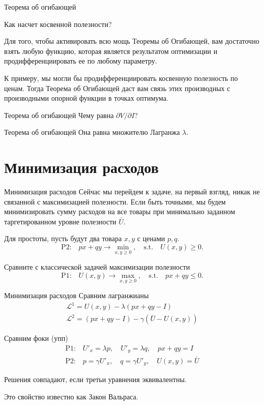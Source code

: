 \documentclass{beamer}
\begin{document}
\begin{frame}{Теорема об огибающей}

Как насчет косвенной полезности?

Для того, чтобы активировать всю мощь Теоремы об Огибающей, вам достаточно взять любую функцию, которая является результатом оптимизации и продифференциировать ее по любому параметру.

К примеру, мы могли бы продифференциировать косвенную полезность по ценам. Тогда Теорема об Огибающей даст вам связь этих производных с производными опорной функции в точках оптимума.

\end{frame}

\begin{frame}{Теорема об огибающей}
Чему равна $\partial V/ \partial I$?
\end{frame}

\begin{frame}{Теорема об огибающей}
Она равна множителю Лагранжа $\lambda$.
\end{frame}

\section{Минимизация расходов}

\begin{frame}{Минимизация расходов}
Сейчас мы перейдем к задаче, на первый взгляд, никак не связанной с максимизацией полезности. Если быть точными, мы будем минимизировать сумму расходов на все товары при минимально заданном таргетированном уровне полезности $\bar U$. 

Для простоты, пусть будут два товара $x, y$ с ценами $p, q$. 
$$\text{P2:} \quad p x + q y \to \min_{x,y \geqslant 0}, \quad \text{s.t.} \quad U(x,y) \geqslant 0.$$

Сравните с классической задачей максимизации полезности
$$\text{P1:} \quad U(x, y) \to \max_{x,y \geqslant 0}, \quad \text{s.t.} \quad p x + q y \leqslant 0.$$
\end{frame}

\begin{frame}{Минимизация расходов}
Сравним лагранжианы
\begin{gather*}
\mathcal{L}^{1} = U(x, y) - \lambda (px + qy - I)\\
\mathcal{L}^{2} = (px + qy - I) - \gamma (\bar U - U(x,y))
\end{gather*}

Сравним фоки (упп)
\begin{gather*}
\text{P1:} \quad U'_x = \lambda p, \quad U'_y = \lambda q, \quad px + qy = I\\
\text{P2:} \quad p = \gamma U'_x, \quad q = \gamma U'_y, \quad U(x,y) = \bar U
\end{gather*}

Решения совпадают, если третьи уравнения эквивалентны.

Это свойство известно как Закон Вальраса.
\end{frame}
\end{document}
